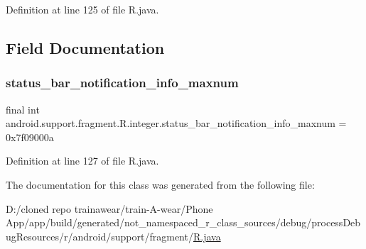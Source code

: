 Definition at line 125 of file R.\+java.


\begin{DoxyCode}{0}

\end{DoxyCode}


\subsection{Field Documentation}
\mbox{\label{classandroid_1_1support_1_1fragment_1_1_r_1_1integer_ad45b5b452400c150732cf1ffbf992c84}} 
\subsubsection{\texorpdfstring{status\_bar\_notification\_info\_maxnum}{status\_bar\_notification\_info\_maxnum}}
{\footnotesize\ttfamily final int android.\+support.\+fragment.\+R.\+integer.\+status\+\_\+bar\+\_\+notification\+\_\+info\+\_\+maxnum = 0x7f09000a\hspace{0.3cm}{\ttfamily [static]}}



Definition at line 127 of file R.\+java.



The documentation for this class was generated from the following file\+:\begin{DoxyCompactItemize}
\item 
D\+:/cloned repo trainawear/train-\/\+A-\/wear/\+Phone App/app/build/generated/not\+\_\+namespaced\+\_\+r\+\_\+class\+\_\+sources/debug/process\+Debug\+Resources/r/android/support/fragment/\mbox{\hyperlink{process_debug_resources_2r_2android_2support_2fragment_2_r_8java}{R.\+java}}\end{DoxyCompactItemize}
